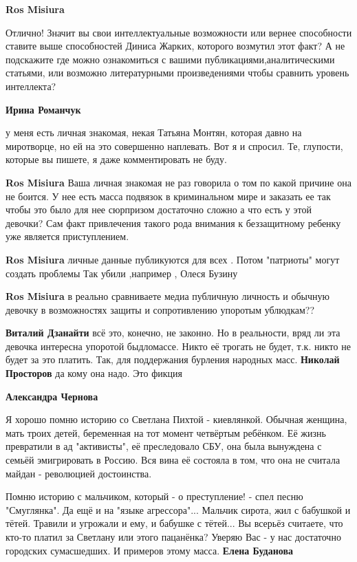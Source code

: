 \begin{itemize}
\begin{itemize}
\textbf{Ros Misiura} 

Отлично! Значит вы свои интеллектуальные возможности или вернее способности
ставите выше способностей Диниса Жарких, которого возмутил этот факт? А не
подскажите где можно ознакомиться с вашими публикациями,аналитическими
статьями, или возможно литературными произведениями чтобы сравнить уровень
интеллекта?

\textbf{Ирина Романчук} 

у меня есть личная знакомая, некая Татьяна Монтян, которая давно на миротворце,
но ей на это совершенно наплевать. Вот я и спросил. Те, глупости, которые вы
пишете, я даже комментировать не буду.

\textbf{Ros Misiura} Ваша личная знакомая не раз говорила о том по какой причине она не боится. У нее есть масса подвязок в криминальном мире и заказать ее так чтобы это было для нее сюрпризом достаточно сложно а что есть у этой девочки? Сам факт привлечения такого рода внимания к беззащитному ребенку уже является приступлением.

\textbf{Ros Misiura} личные данные публикуются для всех . Потом "патриоты" могут создать проблемы Так убили ,например , Олеся Бузину

\textbf{Ros Misiura} в реально сравниваете медиа публичную личность и обычную девочку в возможностях защиты и сопротивлению упоротым ублюдкам??

\textbf{Виталий Дзанайти} всё это, конечно, не законно. Но в реальности, вряд ли эта девочка интересна упоротой быдломассе. Никто её трогать не будет, т.к. никто не будет за это платить. Так, для поддержания бурления народных масс.
\textbf{Николай Просторов} да кому она надо. Это фикция

\textbf{Александра Чернова} 

Я хорошо помню историю со Светлана Пихтой - киевлянкой.  Обычная женщина, мать
троих детей, беременная на тот момент четвёртым ребёнком. Её жизнь превратили в
ад "активисты", её преследовало СБУ, она была вынуждена с семьёй эмигрировать в
Россию. Вся вина её состояла в том, что она не считала майдан - революцией
достоинства.

Помню историю с мальчиком, который - о преступление! - спел песню "Смуглянка". Да ещё и на "языке агрессора"...
Мальчик сирота, жил с бабушкой и тётей. Травили и угрожали и ему, и бабушке с тётей...
Вы всерьёз считаете, что кто-то платил за Светлану или этого пацанёнка?
Уверяю Вас - у нас достаточно городских сумасшедших.
И примеров этому масса.
\textbf{Елена Буданова} 


\end{itemize}
\end{itemize}
